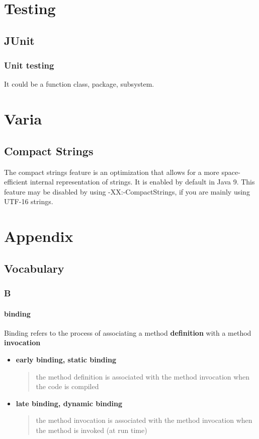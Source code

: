 \documentclass{report}
\begin{document}
\part{Testing}



\chapter{JUnit}


\section{Unit testing}
It could be a function class, package, subsystem.




\part{Varia}



\chapter{Compact Strings}
The compact strings feature is an optimization that allows for a more space-efficient internal representation of strings. It is enabled by default in Java 9. This feature may be disabled by using -XX:-CompactStrings, if you are mainly using UTF-16 strings.




\part{Appendix}



\chapter{Vocabulary}


\section{B}

\subsection{binding}
Binding refers to the process of associating a method \textbf{definition} with a method \textbf{invocation}
\begin{itemize}
	\item \textbf{early binding, static binding}
	 \begin{quote}
	 	the method definition is associated with the method invocation when the code is compiled
	 \end{quote}
	 \item \textbf{late binding, dynamic binding}
	 \begin{quote}
	 	the method invocation is associated with the method invocation when the method is invoked (at run time)
	 \end{quote}
\end{itemize}
\end{document}

